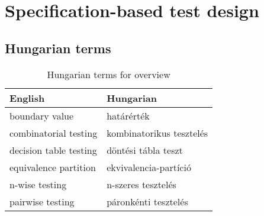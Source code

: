 \chapter{Specification-based test design}


\section{Hungarian terms}

\begin{table}
    \centering
    \small
    \caption{Hungarian terms for overview}
    \begin{tabular}{ll}
        \toprule
        \textbf{English} & \textbf{Hungarian} \\
        \midrule
        boundary value & határérték \\
        combinatorial testing & kombinatorikus tesztelés \\
        decision table testing & döntési tábla teszt \\
        equivalence partition & ekvivalencia-partíció \\
        n-wise testing & n-szeres tesztelés \\
        pairwise testing & páronkénti tesztelés \\
        \bottomrule
    \end{tabular}
    \label{tab:overview:hungarian-terms-testing-specification}
\end{table} 